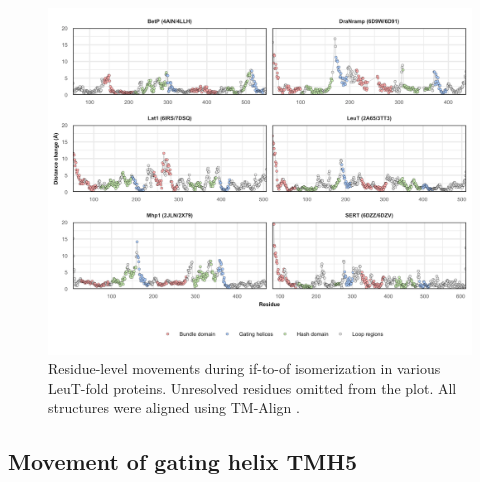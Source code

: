 \begin{figure}[h!]
\centering
\includegraphics[width=6.5in]{Figures/leutintro_rmsf.pdf}
 \caption[Residue-level movements during IF-to-OF isomerization in various LeuT-fold proteins.]{Residue-level movements during \gls{if}-to-\gls{of} isomerization in various LeuT-fold proteins. Unresolved residues omitted from the plot. All structures were aligned using TM-Align \citep*{Xu2010, Zhang2005}.}
\label{fig:leutintro_rmsf}
\end{figure}

\subsection{Movement of gating helix TMH5}\label{sec:leutintro_tm5}

